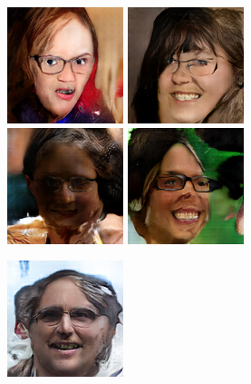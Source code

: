 \clearpage

\begin{figure}[!h]
    \begin{subfigure}[b]{\textwidth}
        \centerline{
            \includegraphics[scale=0.743]{figures/ffhq/labeled-glasses-yes/ffhq128x128_image065.png}
            \includegraphics[scale=0.743]{figures/ffhq/labeled-glasses-yes/ffhq128x128_image066.png}
            \includegraphics[scale=0.743]{figures/ffhq/labeled-glasses-yes/ffhq128x128_image069.png}
            \includegraphics[scale=0.743]{figures/ffhq/labeled-glasses-yes/ffhq128x128_image073.png}
        }
        \vspace{0.1cm}
        \centerline{
            \includegraphics[scale=0.485]{figures/ffhq/labeled-glasses-yes/ffhq128x128_image006.png}
}
\end{subfigure}
\end{figure}
